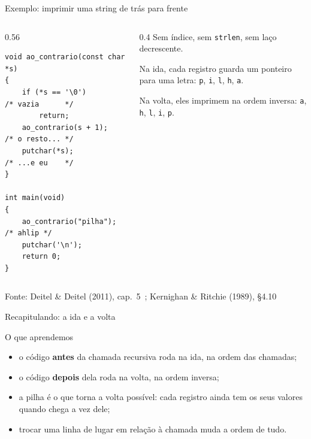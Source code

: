 \documentclass[aspectratio=169]{beamer}
\newcommand{\fonte}[1]{\vfill\hfill{\scriptsize\textcolor{UFSGray}{Fonte: #1}}}
\begin{document}
\begin{frame}[fragile]{Exemplo: imprimir uma string de trás para frente}
  \begin{columns}[c]
    \begin{column}{0.56\textwidth}
\begin{lstlisting}[style=tinyC]
void ao_contrario(const char *s)
{
    if (*s == '\0')         /* vazia      */
        return;
    ao_contrario(s + 1);    /* o resto... */
    putchar(*s);            /* ...e eu    */
}

int main(void)
{
    ao_contrario("pilha");  /* ahlip */
    putchar('\n');
    return 0;
}
\end{lstlisting}
    \end{column}
    \begin{column}{0.4\textwidth}
      \small
      Sem índice, sem \texttt{strlen}, sem laço decrescente.

      \medskip
      Na ida, cada registro guarda um ponteiro para uma letra:
      \texttt{p}, \texttt{i}, \texttt{l}, \texttt{h}, \texttt{a}.

      \medskip
      Na volta, eles imprimem na ordem inversa:
      \texttt{a}, \texttt{h}, \texttt{l}, \texttt{i}, \texttt{p}.
    \end{column}
  \end{columns}
  \fonte{Deitel \& Deitel (2011), cap.~5~\cite{deitel2011como};
    Kernighan \& Ritchie (1989), §4.10~\cite{kernighan1989c}}
\end{frame}

\begin{frame}{Recapitulando: a ida e a volta}
  \begin{block}{O que aprendemos}
    \begin{itemize}
      \item o código \textbf{antes} da chamada recursiva roda na ida, na
        ordem das chamadas;
      \item o código \textbf{depois} dela roda na volta, na ordem inversa;
      \item a pilha é o que torna a volta possível: cada registro ainda tem
        os seus valores quando chega a vez dele;
      \item trocar uma linha de lugar em relação à chamada muda a ordem de
        tudo.
    \end{itemize}
  \end{block}
\end{frame}

\end{document}
